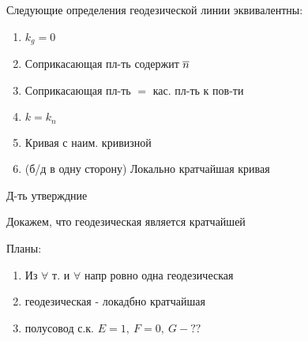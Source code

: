 \documentclass[main]{subfiles}
\begin{document}
    \begin{utv}
        Следующие определения геодезической линии эквивалентны:
        \begin{enumerate}
          \item $k_g = 0$
          \item Соприкасающая пл-ть содержит $\overline{n}$
          \item Соприкасающая пл-ть $=$ кас. пл-ть к пов-ти
          \item $k = k_n$
          \item Кривая с наим. кривизной
          \item (б/д в одну сторону) Локально кратчайшая кривая
        \end{enumerate}
    \end{utv}

    \begin{upr}
        Д-ть утверждние

        Докажем, что геодезическая является кратчайшей
    \end{upr}

    Планы:
    \begin{enumerate}
      \item Из $\forall$ т. и $\forall$ напр ровно одна геодезическая
      \item геодезическая - локадбно кратчайшая
      \item полусовод с.к. $E=1,\ F = 0,\ G -??$
    \end{enumerate}
\end{document}
